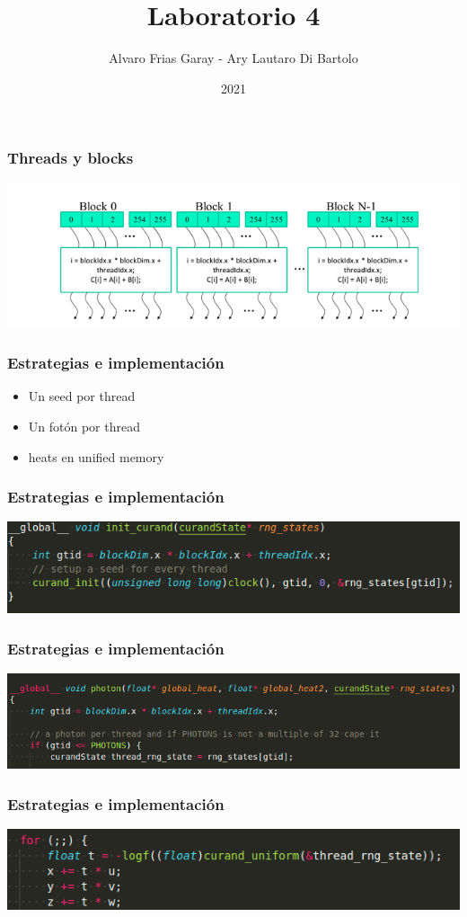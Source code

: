 \documentclass{beamer}
\title{Laboratorio 4}
\author{Alvaro Frias Garay - Ary Lautaro Di Bartolo}
\institute{Universidad Nacional de Córdoba - Universidad Nacional de Cuyo}
\date{2021}
\begin{document}
\frame{\titlepage}

\begin{frame}
    \frametitle{Threads y blocks}
    \includegraphics[width=\textwidth]{imagenes/graf_threads_blocks.png}
\end{frame}

\begin{frame}
    \frametitle{Estrategias e implementación}
    \begin{itemize}
        \item Un seed por thread
        \item Un fotón por thread
        \item heats en unified memory
    \end{itemize}
\end{frame}

\begin{frame}
    \frametitle{Estrategias e implementación}
    \includegraphics[width=\textwidth]{imagenes/code1.png}
\end{frame}

\begin{frame}
    \frametitle{Estrategias e implementación}
    \includegraphics[width=\textwidth]{imagenes/code2.png}

\end{frame}

\begin{frame}
    \frametitle{Estrategias e implementación}
    \includegraphics[width=\textwidth]{imagenes/code3.png}

\end{frame}
\end{document}
